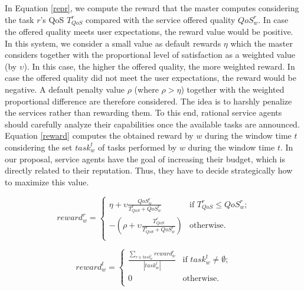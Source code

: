 In Equation \ref{repr}, we compute the reward that the master
computes considering the task $r$'s QoS $T_{QoS}^r$ compared with
the service offered quality $QoS_w^r$. In case the offered quality
meets user expectations, the reward value would be positive. In
this system, we consider a small value as default rewards $\eta$
which the master considers together with the proportional level of
satisfaction as a weighted value (by $\upsilon$). In this case,
the higher the offered quality, the more weighted reward. In case
the offered quality did not meet the user expectations, the reward
would be negative. A default penalty value $\rho$ (where
$\rho>\eta$) together with the weighted proportional difference
are therefore considered. The idea is to harshly penalize the
services rather than rewarding them. To this end, rational service
agents should carefully analyze their capabilities once the
available tasks are announced. Equation \ref{reward} computes the
obtained reward by $w$ during the window time $t$ considering the
set $task_w^t$ of tasks performed by $w$ during the window time
$t$. In our proposal, service agents have the goal of increasing
their budget, which is directly related to their reputation. Thus,
they have to decide strategically how to maximize this value.

\begin{equation} \label{repr}
reward_w^r = \begin{cases}
\eta + \upsilon \frac{QoS_w^r}{T_{QoS}^r+QoS_w^r}   & \text{if $T_{QoS}^r\leq QoS_w^r$;}\\
-(\rho +  \upsilon \frac{T_{QoS}^r}{T_{QoS}^r+QoS_w^r} ) & \text{otherwise.}\\
\end{cases}
\end{equation}


\begin{equation} \label{reward}
reward_w^t =
\begin{cases}
\frac{\sum_{r \in
task_w^t}reward_w^r}{|task_w^t|}& \text{if $task_w^t \neq \emptyset$;}\\
0 & \text{otherwise.}\\
\end{cases}
\end{equation}

